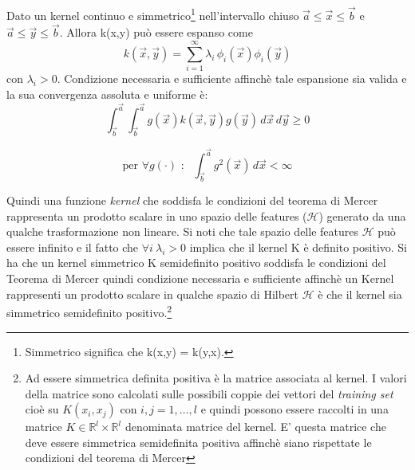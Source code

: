 \begin{teorema}Dato un kernel continuo e simmetrico\footnote{Simmetrico significa che k(x,y) = k(y,x).} nell'intervallo chiuso    $\overrightarrow{a} \leq \overrightarrow{x} \leq \overrightarrow{b}$ e $\overrightarrow{a} \leq \overrightarrow{y} \leq \overrightarrow{b}$. Allora k(x,y) può essere espanso come
\begin{equation}
k(\overrightarrow{x},\overrightarrow{y}) = \sum_{i=1}^{\infty}\lambda_i\,\phi_i(\overrightarrow{x})\phi_i(\overrightarrow{y})
\end{equation}
con $\lambda_i > 0$. Condizione necessaria e sufficiente affinchè tale espansione sia valida e la sua convergenza assoluta e uniforme è:
\begin{equation*}
\int_{\overrightarrow{b}}^{\overrightarrow{a}}\int_{\overrightarrow{b}}^{\overrightarrow{a}} g(\overrightarrow{x})k(\overrightarrow{x},\overrightarrow{y})g(\overrightarrow{y})\,d\overrightarrow{x}\,d\overrightarrow{y} \geq 0
\end{equation*}

\begin{equation*}
\text{per } \forall g(\cdot) \text{ : } \:\:\int_{\overrightarrow{b}}^{\overrightarrow{a}}g^2(\overrightarrow{x})\,d\overrightarrow{x} < \infty
\end{equation*}
\end{teorema}

Quindi una funzione \textit{kernel} che soddisfa le condizioni del teorema di Mercer rappresenta un prodotto scalare in uno spazio delle features ($\mathcal{H}$) generato da una qualche trasformazione non lineare. Si noti che tale spazio delle features $\mathcal{H}$ può essere infinito e il fatto che $\forall i \:\lambda_i > 0$ implica che il kernel K è definito positivo. Si ha che un kernel simmetrico K semidefinito positivo soddisfa le condizioni del Teorema di Mercer quindi condizione necessaria e sufficiente affinchè un Kernel rappresenti un prodotto scalare in qualche spazio di Hilbert $\mathcal{H}$ è che il kernel sia simmetrico semidefinito positivo.\footnote{\label{note:hessiano}Ad essere simmetrica definita positiva è la matrice associata al kernel. I valori della matrice sono calcolati sulle possibili coppie dei vettori del \textit{training set} cioè su $K(x_i,x_j) \text{ con } i,j=1,\dots,l$ e quindi possono essere raccolti in una matrice $K \in \mathbb{R}^l \times \mathbb{R}^l$ denominata matrice del kernel. E' questa matrice che deve essere simmetrica semidefinita positiva affinchè siano rispettate le condizioni del teorema di Mercer} 

